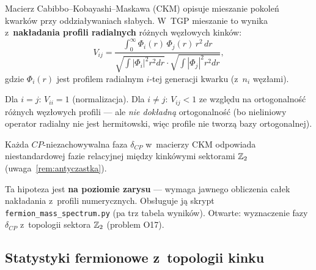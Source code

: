 \begin{hypothesis}%
\label{hyp:ckm}
Macierz Cabibbo--Kobayashi--Maskawa (CKM) opisuje mieszanie
pokole\'n kwarków przy oddzia\l{}ywaniach s\l{}abych.
W~TGP mieszanie to wynika z~\textbf{nak\l{}adania profili
radialnych} r\'o\.znych w\k{e}z\l{}owych kink\'ow:
\begin{equation}\label{eq:ckm-overlap}
    V_{ij}
    = \frac{\int_0^\infty \Phi_i(r)\,\Phi_j(r)\,r^2\,dr}
           {\sqrt{\int|\Phi_i|^2 r^2 dr}\cdot\sqrt{\int|\Phi_j|^2 r^2 dr}},
\end{equation}
gdzie $\Phi_i(r)$ jest profilem radialnym $i$-tej generacji kwarku
(z~$n_i$ w\k{e}z\l{}ami).

Dla $i = j$: $V_{ii} = 1$ (normalizacja).
Dla $i \neq j$: $V_{ij} < 1$ ze wzgl\k{e}du na ortogonalno\'s\'c
r\'o\.znych w\k{e}z\l{}owych profili --- ale \emph{nie dokładną}
ortogonalno\'s\'c (bo nieliniowy operator radialny nie jest
hermitowski, wi\k{e}c profile nie tworz\k{a} bazy ortogonalnej).

Ka\.zda $CP$-niezachowywalna faza $\delta_{CP}$ w~macierzy CKM
odpowiada niestandardowej fazie relacyjnej mi\k{e}dzy kink\'owymi
sektorami $\mathbb{Z}_2$ (uwaga~\ref{rem:antyczastka}).
\end{hypothesis}

\begin{remark}
Ta hipoteza jest \textbf{na poziomie zarysu} --- wymaga jawnego
obliczenia ca\l{}ek nak\l{}adania z~profili numerycznych.
Obs\l{}uguje j\k{a} skrypt \texttt{fermion\_mass\_spectrum.py}
(pa trz tabela wynik\'ow). Otwarte: wyznaczenie fazy $\delta_{CP}$
z~topologii sektora $\mathbb{Z}_2$ (problem O17).
\end{remark}

\subsection{Statystyki fermionowe z~topologii kinku}%
\label{app:F-statistics}

